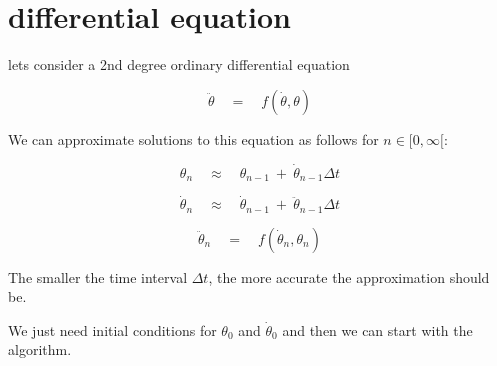 \documentclass[12pt]{article}
\begin{document}
	\section{differential equation}
	
	lets consider a 2nd degree ordinary differential equation
	
	$$
	\ddot{\theta} \quad = \quad f(\dot{\theta}, \theta)
	$$
	
	We can approximate solutions to this equation as follows for $n \in [0, \infty[$:
	
	$$
	\theta_n \quad \approx \quad \theta_{n-1} \ + \ \dot{\theta}_{n-1} \Delta t
	$$
	
	$$
	\dot{\theta}_n \quad \approx \quad \dot{\theta}_{n-1} \ + \ \ddot{\theta}_{n-1} \Delta t
	$$
	
	$$
	\ddot{\theta}_n \quad = \quad f(\dot{\theta}_n, \theta_n)
	$$
	
	The smaller the time interval $\Delta t$, the more accurate the approximation should be.
	
	We just need initial conditions for $\theta_0$ and $\dot{\theta}_0$ and then we can start with the algorithm.
\end{document}
